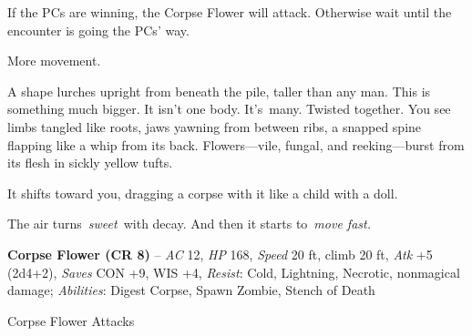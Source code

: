 \documentclass[10pt,twocolumn]{article}
\let\oldtextbf\textbf
\renewcommand{\textbf}[1]{\oldtextbf{{#1}}}
\renewenvironment{quote}
  {%
    \begingroup
      \setlength{\parindent}{1em}%
      \setlength{\parskip}{0pt}%
      \begin{tcolorbox}[myquote,
        before upper={%
          \let\textbf\oldtextbf
          \setlength{\parindent}{1.5em}%
          \setlength{\parskip}{0pt}%
          \noindent              %
        }%
      ]%
  }
  {%
      \end{tcolorbox}%
    \endgroup
  }
\begin{document}
If the PCs are winning, the Corpse Flower will attack. Otherwise wait
until the encounter is going the PCs' way.

\begin{quote}
More movement.

A shape lurches upright from beneath the pile, taller than any man. This
is something much bigger. It isn't one body. It's~many. Twisted
together. You see limbs tangled like roots, jaws yawning from between
ribs, a snapped spine flapping like a whip from its back.
Flowers---vile, fungal, and reeking---burst from its flesh in sickly
yellow tufts.

It shifts toward you, dragging a corpse with it like a child with a
doll.

The air turns~\emph{sweet}~with decay. And then it starts to~\emph{move
fast.}
\end{quote}

\begin{tcolorbox}[
  enhanced,
  breakable,
  colback={encountercolor},
  colframe=black,
  boxrule=1pt,
  coltext=black,
  arc=6pt,
  left=4pt,
  right=4pt,
  top=2pt,
  bottom=2pt,
  boxsep=4pt,
  before skip=10pt,
  after skip=10pt,
  fontupper={\blockquoteFont\small\linespread{0.9}\selectfont\color{black}}
]

\faSkull\hspace{0.8em}\begin{minipage}[t]{\dimexpr\linewidth-1.8em\hangindent=1.8em\hangafter=0}\textbf{Corpse
Flower (CR 8)} -- \emph{AC} 12, \emph{HP} 168, \emph{Speed} 20 ft, climb
20 ft, \emph{Atk} +5 (2d4+2), \emph{Saves} CON +9, WIS +4,
\emph{Resist}: Cold, Lightning, Necrotic, nonmagical damage;
\emph{Abilities}: Digest Corpse, Spawn Zombie, Stench of Death

\end{minipage}\end{tcolorbox}

\begin{tcolorbox}[
  colback={imagecolor},
  coltext=black,
  colframe=black,
  boxrule=1pt,
  arc=6pt,
  left=4pt,
  right=4pt,
  top=2pt,
  bottom=2pt,
  boxsep=4pt,
  before skip=10pt,
  after skip=10pt,
  fontupper={\blockquoteFont\small\linespread{0.9}\selectfont\color{black}}
]

\faPhotoVideo\hspace{0.8em}\begin{minipage}[t]{\dimexpr\linewidth-1.8em\hangindent=1.8em\hangafter=0}Corpse
Flower Attacks

\end{minipage}\end{tcolorbox}
\end{document}
